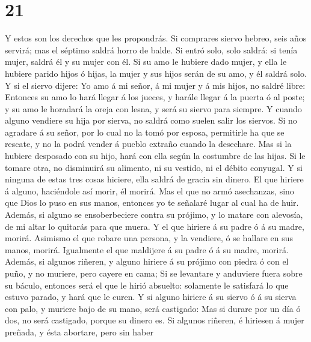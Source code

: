 \hypertarget{section-20}{%
\section{21}\label{section-20}}

 Y estos son los derechos que les propondrás. 
Si comprares siervo hebreo, seis años servirá; mas el séptimo saldrá
horro de balde.  Si entró solo, solo saldrá: si tenía mujer,
saldrá él y su mujer con él.  Si su amo le hubiere dado
mujer, y ella le hubiere parido hijos ó hijas, la mujer y sus hijos
serán de su amo, y él saldrá solo.  Y si el siervo dijere:
Yo amo á mi señor, á mi mujer y á mis hijos, no saldré libre:
 Entonces su amo lo hará llegar á los jueces, y harále
llegar á la puerta ó al poste; y su amo le horadará la oreja con lesna,
y será su siervo para siempre.  Y cuando alguno vendiere su
hija por sierva, no saldrá como suelen salir los siervos. 
Si no agradare á su señor, por lo cual no la tomó por esposa, permitirle
ha que se rescate, y no la podrá vender á pueblo extraño cuando la
desechare.  Mas si la hubiere desposado con su hijo, hará
con ella según la costumbre de las hijas.  Si le tomare
otra, no disminuirá su alimento, ni su vestido, ni el débito conyugal.
 Y si ninguna de estas tres cosas hiciere, ella saldrá de
gracia sin dinero.  El que hiriere á alguno, haciéndole así
morir, él morirá.  Mas el que no armó asechanzas, sino que
Dios lo puso en sus manos, entonces yo te señalaré lugar al cual ha de
huir.  Además, si alguno se ensoberbeciere contra su
prójimo, y lo matare con alevosía, de mi altar lo quitarás para que
muera.  Y el que hiriere á su padre ó á su madre, morirá.
 Asimismo el que robare una persona, y la vendiere, ó se
hallare en sus manos, morirá.  Igualmente el que maldijere
á su padre ó á su madre, morirá.  Además, si algunos
riñeren, y alguno hiriere á su prójimo con piedra ó con el puño, y no
muriere, pero cayere en cama;  Si se levantare y anduviere
fuera sobre su báculo, entonces será el que le hirió absuelto: solamente
le satisfará lo que estuvo parado, y hará que le curen.  Y
si alguno hiriere á su siervo ó á su sierva con palo, y muriere bajo de
su mano, será castigado:  Mas si durare por un día ó dos,
no será castigado, porque su dinero es.  Si algunos
riñeren, é hiriesen á mujer preñada, y ésta abortare, pero sin haber
